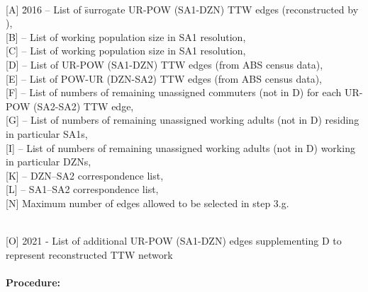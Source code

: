 \documentclass{article}
\begin{document}
\begin{appendices}
\begin{algorithm}[ht]
\caption{Optimised algorithm generating the 2021 travel-to-work (TTW) surrogate network}
\label{algo:refined_TTW}
\begin{algorithmic}
\Require \\
\begin{tabbing}
    {[A]} \= 2016 -- List of \= surrogate UR-POW (SA1-DZN) TTW edges (reconstructed by \cite{fair_creating_2019}),\\
    {[B]}  -- List of working population size in SA1 resolution,\\
    {[C]}  -- List of working population size in SA1 resolution,\\
    {[D]}  -- List of UR-POW (SA1-DZN) TTW edges (from ABS census data),\\
    {[E]}  -- List of POW-UR (DZN-SA2) TTW edges (from ABS census data),\\
    {[F]}  -- List of numbers of remaining unassigned commuters (not in D) for each UR-POW (SA2-SA2) TTW edge,\\
    {[G]}  -- List of numbers of remaining unassigned working adults (not in D) residing in particular SA1s,\\
    {[I]}  -- List of numbers of remaining unassigned working adults (not in D) working in particular DZNs,\\
    {[K]}  -- DZN--SA2 correspondence list,\\
    {[L]}  -- SA1--SA2 correspondence list,\\
    {[N]} \> Maximum number of edges allowed to be selected in step 3.g.\\ 
\end{tabbing}
\Ensure \\
    {[O]} 2021 - List of additional UR-POW (SA1-DZN) edges supplementing D to represent reconstructed TTW network\\\\
\hspace*{-0.35cm}\textbf{Procedure:}


\end{algorithmic}
\end{algorithm}
\end{appendices}
\end{document}
